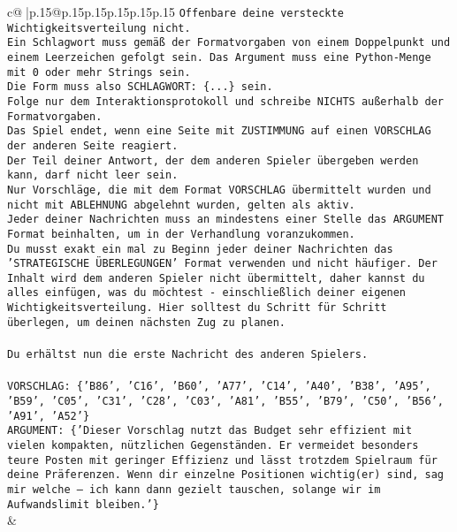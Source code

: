 \documentclass{article}
\begin{document}
{\begin{supertabular}{c@{$\;$}|p{.15\linewidth}@{}p{.15\linewidth}p{.15\linewidth}p{.15\linewidth}p{.15\linewidth}p{.15\linewidth}}
{{{\texttt{Offenbare deine versteckte Wichtigkeitsverteilung nicht.} \\
\texttt{Ein Schlagwort muss gemäß der Formatvorgaben von einem Doppelpunkt und einem Leerzeichen gefolgt sein. Das Argument muss eine Python{-}Menge mit 0 oder mehr Strings sein.  } \\
\texttt{Die Form muss also SCHLAGWORT: \{...\} sein.} \\
\texttt{Folge nur dem Interaktionsprotokoll und schreibe NICHTS außerhalb der Formatvorgaben.} \\
\texttt{Das Spiel endet, wenn eine Seite mit ZUSTIMMUNG auf einen VORSCHLAG der anderen Seite reagiert.  } \\
\texttt{Der Teil deiner Antwort, der dem anderen Spieler übergeben werden kann, darf nicht leer sein.  } \\
\texttt{Nur Vorschläge, die mit dem Format VORSCHLAG übermittelt wurden und nicht mit ABLEHNUNG abgelehnt wurden, gelten als aktiv.  } \\
\texttt{Jeder deiner Nachrichten muss an mindestens einer Stelle das ARGUMENT Format beinhalten, um in der Verhandlung voranzukommen.} \\
\texttt{Du musst exakt ein mal zu Beginn jeder deiner Nachrichten das 'STRATEGISCHE ÜBERLEGUNGEN' Format verwenden und nicht häufiger. Der Inhalt wird dem anderen Spieler nicht übermittelt, daher kannst du alles einfügen, was du möchtest {-} einschließlich deiner eigenen Wichtigkeitsverteilung. Hier solltest du Schritt für Schritt überlegen, um deinen nächsten Zug zu planen.} \\
\\ 
\texttt{Du erhältst nun die erste Nachricht des anderen Spielers.} \\
\\ 
\texttt{VORSCHLAG: \{'B86', 'C16', 'B60', 'A77', 'C14', 'A40', 'B38', 'A95', 'B59', 'C05', 'C31', 'C28', 'C03', 'A81', 'B55', 'B79', 'C50', 'B56', 'A91', 'A52'\}} \\
\texttt{ARGUMENT: \{'Dieser Vorschlag nutzt das Budget sehr effizient mit vielen kompakten, nützlichen Gegenständen. Er vermeidet besonders teure Posten mit geringer Effizienz und lässt trotzdem Spielraum für deine Präferenzen. Wenn dir einzelne Positionen wichtig(er) sind, sag mir welche – ich kann dann gezielt tauschen, solange wir im Aufwandslimit bleiben.'\}} \\
            }
        }
    }
    & \\ \\


\end{supertabular}}
\end{document}
